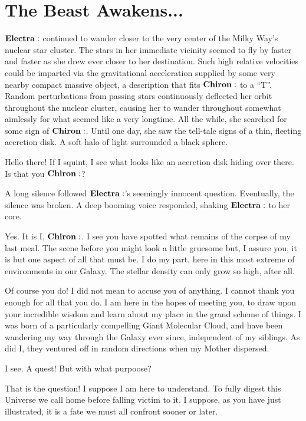\section{The Beast Awakens...}

$\Electra$ continued to wander closer to the very center of the Milky Way's nuclear star cluster.  The stars in her immediate vicinity seemed to fly by faster and faster as she drew ever closer to her destination.  Such high relative velocities could  be imparted via the gravitational acceleration supplied by some very nearby compact massive object, a description that fits $\Chiron$ to a ``T''.  Random perturbations from passing stars continuously deflected her orbit throughout the nuclear cluster, causing her to wander throughout somewhat aimlessly for what seemed like a very longtime.  All the while, she searched for some sign of $\Chiron$.  Until one day, she saw the tell-tale signs of a thin, fleeting accretion disk.  A soft halo of light surrounded a black sphere.

\Electra  Hello there!  If I squint, I see what looks like an accretion disk hiding over there.  Is that you $\Chiron$?

A long silence followed $\Electra$'s seemingly innocent question.  Eventually, the silence was broken. A deep booming voice responded, shaking $\Electra$ to her core.

\Chiron Yes.  It is I, $\Chiron$.  I see you have spotted what remains of the corpse of my last meal.  The scene before you might look a little gruesome but, I assure you, it is but one aspect of all that must be.  I do my part, here in this most extreme of environments in our Galaxy.  The stellar density can only grow so high, after all.

\Electra Of course you do!  I did not mean to accuse you of anything.  I cannot thank you enough for all that you do.  I am here in the hopes of meeting you, to draw upon your incredible wisdom and learn about my place in the grand scheme of things.  I was born of a particularly compelling Giant Molecular Cloud, and have been wandering my way through the Galaxy ever since, independent of my siblings.  As did I, they ventured off in random directions when my Mother dispersed.

\Chiron I see.  A quest!  But with what purpoose?

\Electra That is the question!  I suppose I am here to understand.  To fully digest this Universe we call home before falling victim to it.  I suppose, as you have just illustrated, it is a fate we must all confront sooner or later.

